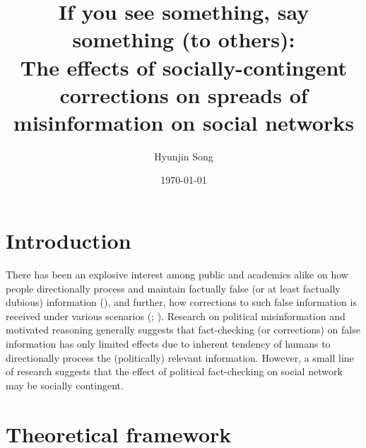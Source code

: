 \documentclass[12pt]{article}
\title{\vspace{.5cm }
  \LARGE{If you see something, say something (to others):} \\
  \large{The effects of socially-contingent corrections on spreads of misinformation on social networks}
  }
\author{Hyunjin Song}
\date{\today}
\begin{document}
\maketitle

\section{Introduction}

There has been an explosive interest among public and academics alike on how people directionally process and maintain factually false (or at least factually dubious) information (\cite{LEWANDOWSKY_JARMC2017}), and further, how corrections to such false information is received under various scenarios (\cites{LEWANDOWSKY_JARMC2017}; \cites{thorson_2016}). Research on political misinformation and motivated reasoning generally suggests that fact-checking (or corrections) on false information has only limited effects due to inherent tendency of humans to directionally process the (politically) relevant information. However, a small line of research suggests that the effect of political fact-checking on social network may be socially contingent.

\section{Theoretical framework}
\end{document}
